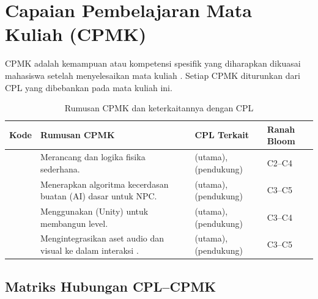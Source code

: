 
\section{Capaian Pembelajaran Mata Kuliah (CPMK)}

CPMK adalah kemampuan atau kompetensi spesifik yang diharapkan dikuasai
mahasiswa setelah menyelesaikan mata kuliah \NamaMK. Setiap CPMK diturunkan
dari CPL yang dibebankan pada mata kuliah ini.

\begin{table}[htbp]
\centering
\caption{Rumusan CPMK dan keterkaitannya dengan CPL}
\label{tab:cpmk}
\begin{tabularx}{\textwidth}{@{}C{2.0cm}Y C{3.6cm} C{1.8cm}@{}}
\toprule
\headrow \textbf{Kode} & \textbf{Rumusan CPMK} & \textbf{CPL Terkait} & \textbf{Ranah Bloom} \\
\midrule
{} &
Merancang  dan logika fisika sederhana. &
 (utama),  (pendukung) &
C2--C4 \\
\addlinespace
{} &
Menerapkan algoritma kecerdasan buatan (AI) dasar untuk NPC. &
 (utama),  (pendukung) &
C3--C5 \\
\addlinespace
{} &
Menggunakan  (Unity) untuk membangun level. &
 (utama),  (pendukung) &
C3--C4 \\
\addlinespace
{} &
Mengintegrasikan aset audio dan visual ke dalam interaksi . &
 (utama),  (pendukung) &
C3--C5 \\
\bottomrule
\end{tabularx}
\end{table}

\subsection{Matriks Hubungan CPL--CPMK}
\label{sec:matriks-cpl-cpmk}


